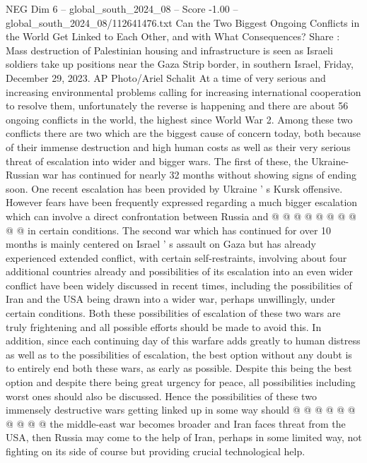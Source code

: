 \begin{textsample}{NEG Dim 6 – global\_south\_2024\_08 – Score -1.00 – global\_south\_2024\_08/112641476.txt}  \label{ex:f6_neg_061}
Can the Two Biggest Ongoing Conflicts in the World Get Linked to Each Other, and with What Consequences?
Share : Mass destruction of Palestinian housing and infrastructure is seen as Israeli soldiers take up positions near the Gaza Strip border, in southern Israel, Friday, December 29, 2023.
AP Photo/Ariel Schalit At a time of very serious and increasing environmental problems calling for increasing international cooperation to resolve them, unfortunately the reverse is happening and there are about 56 ongoing conflicts in the world, the highest since World War 2.
Among these two conflicts there are two which are the biggest cause of concern today, both because of their immense destruction and high human costs as well as their very serious threat of escalation into wider and bigger wars.
The first of these, the Ukraine-Russian war has continued for nearly 32 months without showing signs of ending soon.
One recent escalation has been provided by Ukraine ' s Kursk offensive.
However fears have been frequently expressed regarding a much bigger escalation which can involve a direct confrontation between Russia and @ @ @ @ @ @ @ @ @ @ in certain conditions.
The second war which has continued for over 10 months is mainly centered on Israel ' s assault on Gaza but has already experienced extended conflict, with certain self-restraints, involving about four additional countries already and possibilities of its escalation into an even wider conflict have been widely discussed in recent times, including the possibilities of Iran and the USA being drawn into a wider war, perhaps unwillingly, under certain conditions.
Both these possibilities of escalation of these two wars are truly frightening and all possible efforts should be made to avoid this.
In addition, since each continuing day of this warfare adds greatly to human distress as well as to the possibilities of escalation, the best option without any doubt is to entirely end both these wars, as early as possible.
Despite this being the best option and despite there being great urgency for peace, all possibilities including worst ones should also be discussed.
Hence the possibilities of these two immensely destructive wars getting linked up in some way should @ @ @ @ @ @ @ @ @ @ the middle-east war becomes broader and Iran faces threat from the USA, then Russia may come to the help of Iran, perhaps in some limited way, not fighting on its side of course but providing crucial technological help.

\end{textsample}

